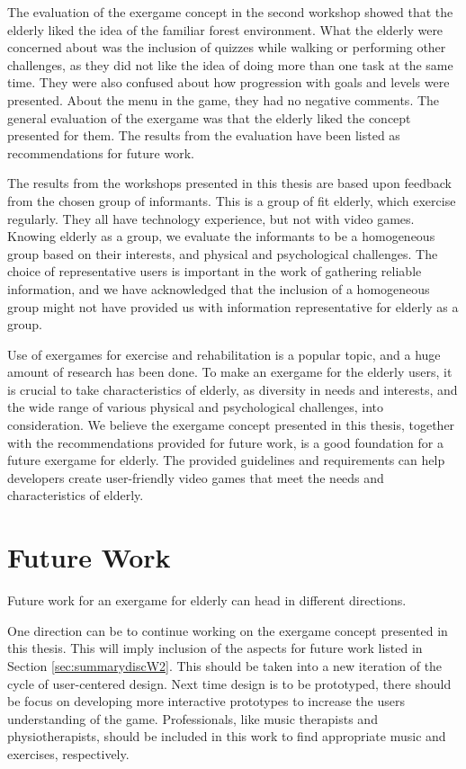 The evaluation of the exergame concept in the second workshop showed that the elderly liked the idea of the familiar forest environment. What the elderly were concerned about was the inclusion of quizzes while walking or performing other challenges, as they did not like the idea of doing more than one task at the same time. They were also confused about how progression with goals and levels were presented. About the menu in the game, they had no negative comments. The general evaluation of the exergame was that the elderly liked the concept presented for them. The results from the evaluation have been listed as recommendations for future work. 

The results from the workshops presented in this thesis are based upon feedback from the chosen group of informants. This is a group of fit elderly, which exercise regularly. They all have technology experience, but not with video games. Knowing elderly as a group, we evaluate the informants to be a homogeneous group based on their interests, and physical and psychological challenges. The choice of representative users is important in the work of gathering reliable information, and we have acknowledged that the inclusion of a homogeneous group might not have provided us with information representative for elderly as a group. 

Use of exergames for exercise and rehabilitation is a popular topic, and a huge amount of research has been done. To make an exergame for the elderly users, it is crucial to take characteristics of elderly, as diversity in needs and interests, and the wide range of various physical and psychological challenges, into consideration. We believe the exergame concept presented in this thesis, together with the recommendations provided for future work, is a good foundation for a future exergame for elderly. The provided guidelines and requirements can help developers create user-friendly video games that meet the needs and characteristics of elderly.
 
\section{Future Work}

Future work for an exergame for elderly can head in different directions. 

One direction can be to continue working on the exergame concept presented in this thesis. This will imply inclusion of the aspects for future work listed in Section \ref{sec:summarydiscW2}. This should be taken into a new iteration of the cycle of user-centered design. Next time design is to be prototyped, there should be focus on developing more interactive prototypes to increase the users understanding of the game. Professionals, like music therapists and physiotherapists, should be included in this work to find appropriate music and exercises, respectively.

